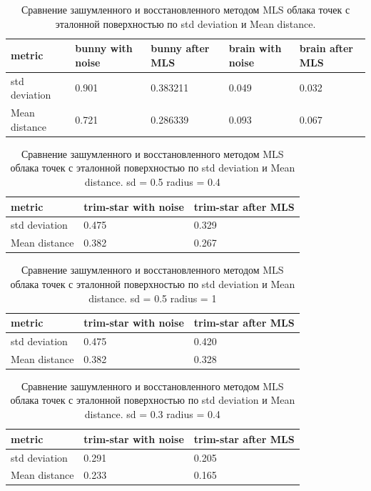\begin{table}[h!]
\centering
\begin{tabular}{|p{3cm} |p{2cm}| p{3cm} | p{2cm} | p{3cm}|}
    \hline
    metric & bunny with noise & bunny after MLS & brain with noise & brain after MLS \\
    \hline\hline
    std deviation & 0.901 & 0.383211 & 0.049 & 0.032\\
    \hline
    Mean distance & 0.721 &  0.286339 & 0.093 & 0.067\\
    \hline
\end{tabular}
\caption{Сравнение зашумленного и восстановленного методом MLS облака точек с эталонной поверхностью по std deviation и Mean distance.}
\label{table:1}
\end{table}

\begin{table}[h!]
\centering
\begin{tabular}{|p{3cm} |p{2cm}| p{3cm} |}
    \hline
    metric & trim-star with noise & trim-star after MLS \\
    \hline\hline
    std deviation & 0.475 &  0.329 \\
    \hline
    Mean distance & 0.382 &   0.267 \\
    \hline
\end{tabular}
\caption{Сравнение зашумленного и восстановленного методом MLS облака точек с эталонной поверхностью по std deviation и Mean distance. sd = 0.5 radius = 0.4}
\label{table:1}
\end{table}

\begin{table}[h!]
\centering
\begin{tabular}{|p{3cm} |p{2cm}| p{3cm} |}
    \hline
    metric & trim-star with noise & trim-star after MLS \\
    \hline\hline
    std deviation & 0.475 &  0.420 \\
    \hline
    Mean distance & 0.382 &   0.328 \\
    \hline
\end{tabular}
\caption{Сравнение зашумленного и восстановленного методом MLS облака точек с эталонной поверхностью по std deviation и Mean distance. sd = 0.5 radius = 1}
\label{table:1}
\end{table}

\begin{table}[h!]
\centering
\begin{tabular}{|p{3cm} |p{2cm}| p{3cm} |}
    \hline
    metric & trim-star with noise & trim-star after MLS \\
    \hline\hline
    std deviation & 0.291 &  0.205 \\
    \hline
    Mean distance & 0.233 &   0.165 \\
    \hline
\end{tabular}
\caption{Сравнение зашумленного и восстановленного методом MLS облака точек с эталонной поверхностью по std deviation и Mean distance. sd = 0.3 radius = 0.4}
\label{table:1}
\end{table}

